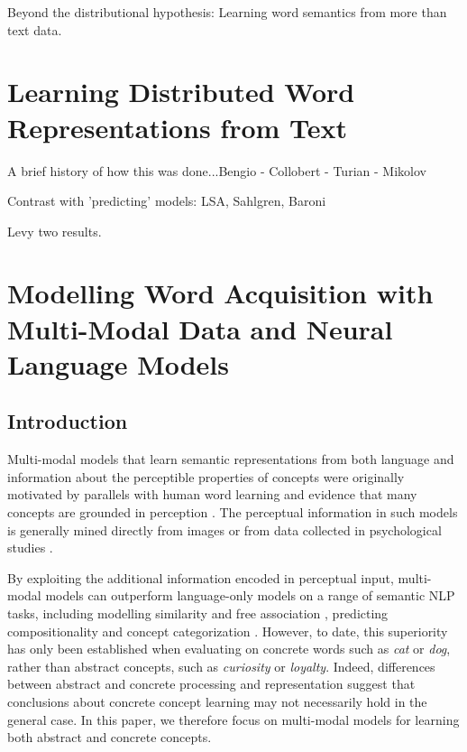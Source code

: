 
Beyond the distributional hypothesis: Learning word semantics from more than text data. 

\section{Learning Distributed Word Representations from Text}

A brief history of how this was done...Bengio - Collobert - Turian - Mikolov

Contrast with 'predicting' models: LSA, Sahlgren, Baroni

Levy two results. 

\section{Modelling Word Acquisition with Multi-Modal Data and Neural Language Models}


\subsection{Introduction}

Multi-modal models that learn semantic representations from both language and information about the perceptible properties of concepts were originally motivated by parallels with human word learning \cite{andrews2009integrating} and evidence that many concepts are grounded in perception \cite{barsalou2005situating}. The perceptual information in such models is generally mined directly from images \cite{feng2010visual,bruni2012distributional} or from data collected in psychological studies \cite{silberer2012grounded,rollermultimodal}. 

By exploiting the additional information encoded in perceptual input, multi-modal models can outperform language-only models on a range of semantic NLP tasks, including modelling similarity \cite{bruni2014multimodal} and free association \cite{silberer2012grounded}, predicting compositionality \cite{rollermultimodal} and concept categorization \cite{silberer2014learning}. However, to date, this superiority has only been established when evaluating on concrete words such as \emph{cat} or \emph{dog}, rather than abstract concepts, such as \emph{curiosity} or \emph{loyalty}. Indeed, differences between abstract and concrete processing and representation \cite{paivio1991dual,hill2013quantitative} suggest that conclusions about concrete concept learning may not necessarily hold in the general case. In this paper, we therefore focus on multi-modal models for learning both abstract and concrete concepts.

